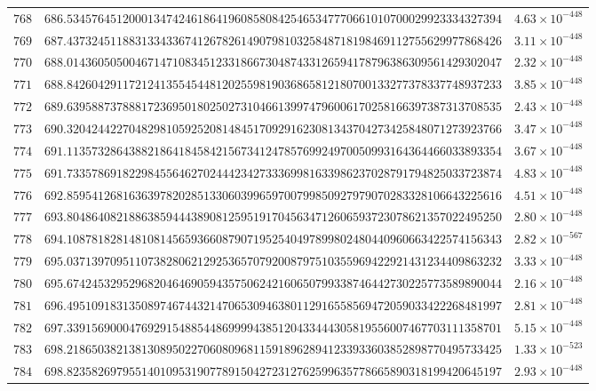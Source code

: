 \documentclass[12pt,reqno]{amsart}
\theoremstyle{remark}
\begin{document}
\begin{longtable}{clc}
$768$ & $686.5345764512000134742461864196085808425465347770661010700029923334327394$ & $4.63\times 10^{-448}$ \\
$769$ & $687.4373245118831334336741267826149079810325848718198469112755629977868426$ & $3.11\times 10^{-448}$ \\
$770$ & $688.0143605050046714710834512331866730487433126594178796386309561429302047$ & $2.32\times 10^{-448}$ \\
$771$ & $688.8426042911721241355454481202559819036865812180700133277378337748937233$ & $3.85\times 10^{-448}$ \\
$772$ & $689.6395887378881723695018025027310466139974796006170258166397387313708535$ & $2.43\times 10^{-448}$ \\
$773$ & $690.3204244227048298105925208148451709291623081343704273425848071273923766$ & $3.47\times 10^{-448}$ \\
$774$ & $691.1135732864388218641845842156734124785769924970050993164364466033893354$ & $3.67\times 10^{-448}$ \\
$775$ & $691.7335786918229845564627024442342733369981633986237028791794825033723874$ & $4.83\times 10^{-448}$ \\
$776$ & $692.8595412681636397820285133060399659700799850927979070283328106643225616$ & $4.51\times 10^{-448}$ \\
$777$ & $693.8048640821886385944438908125951917045634712606593723078621357022495250$ & $2.80\times 10^{-448}$ \\
$778$ & $694.1087818281481081456593660879071952540497899802480440960663422574156343$ & $2.82\times 10^{-567}$ \\
$779$ & $695.0371397095110738280621292536570792008797510355969422921431234409863232$ & $3.33\times 10^{-448}$ \\
$780$ & $695.6742453295296820464690594357506242160650799338746442730225773589890044$ & $2.16\times 10^{-448}$ \\
$781$ & $696.4951091831350897467443214706530946380112916558569472059033422268481997$ & $2.81\times 10^{-448}$ \\
$782$ & $697.3391569000476929154885448699994385120433444305819556007467703111358701$ & $5.15\times 10^{-448}$ \\
$783$ & $698.2186503821381308950227060809681159189628941233933603852898770495733425$ & $1.33\times 10^{-523}$ \\
$784$ & $698.8235826979551401095319077891504272312762599635778665890318199420645197$ & $2.93\times 10^{-448}$ \\

\end{longtable}
\end{document}
